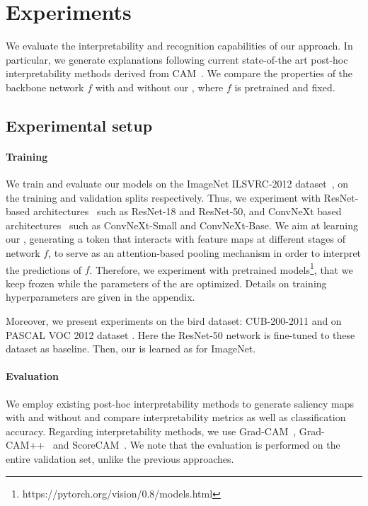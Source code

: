 \section{Experiments}
\label{sec:exp}

We evaluate the interpretability and recognition capabilities of our approach. In particular, we generate explanations following current state-of-the art post-hoc interpretability methods derived from CAM~\cite{zhou2016learning}. We compare the properties of the backbone network $f$ with and without our \Ours, where $f$ is pretrained and fixed.

\subsection{Experimental setup}
\label{subsec:setup}

\paragraph{Training}

We train and evaluate our models on the ImageNet ILSVRC-2012 dataset~\cite{deng2009imagenet}, on the training and validation splits respectively. Thus, we experiment with ResNet-based architectures~\cite{he2016deep} such as ResNet-18 and ResNet-50, and ConvNeXt based architectures~\cite{liu2022convnet} such as ConvNeXt-Small and ConvNeXt-Base. We aim at learning our \Ours, generating a \cls token that interacts with feature maps at different stages of network $f$, to serve as an attention-based pooling mechanism in order to interpret the predictions of $f$. Therefore, we experiment with pretrained models\footnote{https://pytorch.org/vision/0.8/models.html}, that we keep frozen while the parameters of the \Ours are optimized. Details on training hyperparameters are given in the appendix.

Moreover, we present experiments on the bird dataset: CUB-200-2011 \cite{WahCUB_200_2011} and on PASCAL VOC 2012 dataset \cite{Everingham15}. Here the ResNet-50 network is fine-tuned to these dataset as baseline. Then, our \Ours is learned as for ImageNet.

\paragraph{Evaluation}

We employ existing post-hoc interpretability methods to generate saliency maps with and without \Ours and compare interpretability metrics as well as classification accuracy. Regarding interpretability methods, we use Grad-CAM~\cite{DBLP:journals/corr/SelvarajuDVCPB16}, Grad-CAM++~\cite{DBLP:journals/corr/abs-1710-11063} and ScoreCAM~\cite{DBLP:journals/corr/abs-1910-01279}. We note that the evaluation is performed on the entire validation set, unlike the previous approaches.

